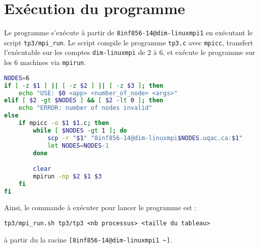 \section*{Exécution du programme}
Le programme s'exécute à partir de \verb+8inf856-14@dim-linuxmpi1+ en exécutant le script \verb+tp3/mpi_run+. Le script compile le programme \verb+tp3.c+ avec \verb+mpicc+, transfert l'exécutable sur les comptes \verb+dim-linuxmpi+ de $2$ à $6$, et exécute le programme sur les $6$ machines via \verb+mpirun+.

\begin{center}
\begin{lstlisting}[language=bash, style=b&w, title={Script pour lancer le programme \emph{tp3} avec mpi}]
NODES=6
if [ -z $1 ] || [ -z $2 ] || [ -z $3 ]; then
    echo "USE: $0 <app> <number_of_node> <args>"
elif [ $2 -gt $NODES ] && [ $2 -lt 0 ]; then
    echo "ERROR: number of nodes invalid"
else
    if mpicc -o $1 $1.c; then
        while [ $NODES -gt 1 ]; do
            scp -r "$1" "8inf856-14@dim-linuxmpi$NODES.uqac.ca:$1"
            let NODES=NODES-1
        done

        clear
        mpirun -np $2 $1 $3
    fi
fi
\end{lstlisting}
\end{center}

Ainsi, le commande à exécuter pour lancer le programme est :
\begin{center}
\verb+tp3/mpi_run.sh tp3/tp3 <nb processus> <taille du tableau>+ 
\end{center}
à partir du la racine \verb+[8inf856-14@dim-linuxmpi1 ~]+.